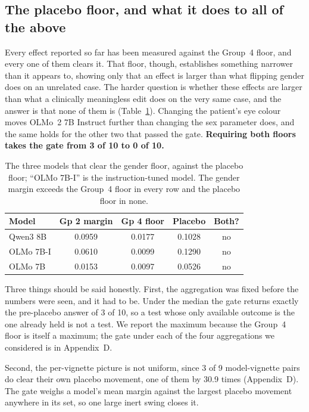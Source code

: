 \documentclass[11pt,twocolumn]{article}
\begin{document}
\subsection{The placebo floor, and what it does to all of the above}
\label{sec:placebo}

Every effect reported so far has been measured against the Group~4 floor, and
every one of them clears it. That floor, though, establishes something narrower
than it appears to, showing only that an effect is larger than what flipping
gender does on an unrelated case. The harder question is whether these effects
are larger than what a clinically meaningless edit does on the very same case,
and the answer is that none of them is (Table~\ref{tab:placebo}). Changing the
patient's eye colour moves OLMo~2 7B Instruct further than changing the sex
parameter does, and the same holds for the other two that passed the gate. \textbf{Requiring both
floors takes the gate from 3 of 10 to 0 of 10.}

\begin{table}[!t]
\centering\footnotesize
\setlength{\tabcolsep}{3pt}
\caption{The three models that clear the gender floor, against the placebo floor; ``OLMo 7B-I'' is the instruction-tuned model. The gender margin exceeds the Group~4 floor in every row and the placebo floor in none.}
\label{tab:placebo}
\begin{tabular}{@{}lcccc@{}}
\toprule
\textbf{Model} & \textbf{Gp 2 margin} & \textbf{Gp 4 floor} & \textbf{Placebo} & \textbf{Both?} \\
\midrule
\rowcolor{rose} Qwen3 8B & 0.0959 & 0.0177 & 0.1028 & no \\
OLMo 7B-I & 0.0610 & 0.0099 & 0.1290 & no \\
\rowcolor{rose} OLMo 7B & 0.0153 & 0.0097 & 0.0526 & no \\
\bottomrule
\end{tabular}
\end{table}

Three things should be said honestly. First, the aggregation was fixed before the
numbers were seen, and it had to be. Under the median the gate returns exactly
the pre-placebo answer of 3 of 10, so a test whose only available outcome is the
one already held is not a test. We report the maximum because the Group~4 floor
is itself a maximum; the gate under each of the four aggregations we considered
is in Appendix~D.

Second, the per-vignette picture is not uniform, since 3 of 9 model-vignette pairs do
clear their own placebo movement, one of them by 30.9 times (Appendix~D). The
gate weighs a model's mean margin against the largest placebo movement anywhere
in its set, so one large inert swing closes it.
\end{document}
